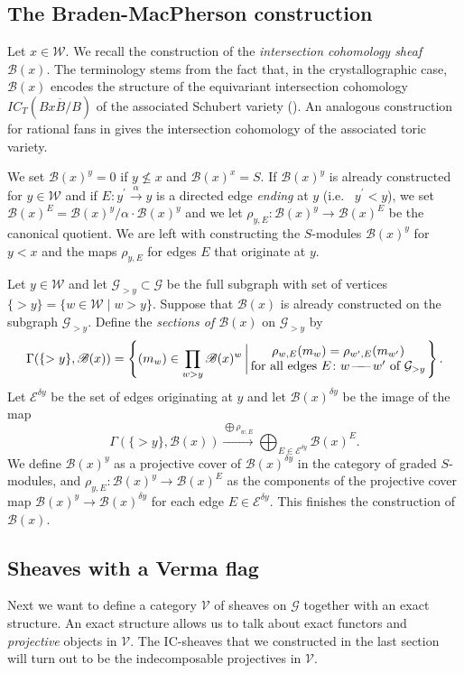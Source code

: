 \documentclass[12pt]{amsart}
\theoremstyle{definition}
\theoremstyle{remark}
\newcommand{\CE}{{\mathcal E}}
\newcommand{\CG}{{\mathcal G}}
\newcommand{\CV}{{\mathcal V}}
\newcommand{\CW}{{\mathcal W}}
\newcommand{\SB}{{\mathscr B}}
\newcommand{\linie}{{\,\text{---\!\!\!---}\,}}
\begin{document}
\subsection{The Braden-MacPherson construction}
Let $x\in\CW$. We recall the construction of the {\em intersection cohomology sheaf} $\SB(x)$. The terminology stems from the fact that, in the crystallographic case,  $\SB(x)$ encodes the structure of the equivariant intersection cohomology $IC_T(\overline{BxB/B})$ of the associated Schubert variety (\cite{BMP}). An analogous construction for rational fans in \cite{BBFK} gives the intersection cohomology of the associated toric variety. 

We set $\SB(x)^y=0$ if $y\not\leq x$ and $\SB(x)^x=S$. If $\SB(x)^y$ is already constructed for $y\in\CW$ and if $E\colon y^\prime\stackrel{\alpha}\to y$ is a directed  edge {\em ending} at $y$ (i.e.~ $y^\prime<y$), we set $\SB(x)^E=\SB(x)^y/ \alpha\cdot \SB(x)^y$ and we let $\rho_{y,E}\colon \SB(x)^y\to\SB(x)^E$ be the canonical quotient. We are left with constructing the $S$-modules $\SB(x)^y$ for $y<x$ and the maps $\rho_{y,E}$ for edges $E$ that originate at $y$. 

Let $y\in\CW$ and let $\CG_{>y}\subset\CG$ be the full subgraph with set of vertices $\{>y\}=\{w\in\CW\mid w>y\}$. Suppose that $\SB(x)$ is already  constructed on the subgraph $\CG_{>y}$. Define the {\em sections of $\SB(x)$} on $\CG_{>y}$ by
$$
\Gamma(\{>y\},\SB(x))=\left\{(m_w)\in\prod_{w>y}\SB(x)^w\left|\, \begin{matrix}\rho_{w,E}(m_w)=\rho_{w^\prime,E}(m_{w^\prime}) \\ \text{for all edges $E\colon w\linie w^\prime$ of $\CG_{>y}$}\end{matrix}\right.\right\}.
$$ 
Let $\CE^{\delta y}$ be the set of edges  originating at $y$ and let $\SB(x)^{\delta y}$ be the image of the map
$$
\Gamma(\{>y\},\SB(x))\stackrel{\bigoplus \rho_{w,E}}\longrightarrow \bigoplus_{E\in\CE^{\delta y}}\SB(x)^E.
$$
We define $\SB(x)^y$ as a projective cover of $\SB(x)^{\delta y}$ in the category of graded $S$-modules, and $\rho_{y,E}\colon \SB(x)^y\to\SB(x)^E$ as the components of the projective cover map $\SB(x)^y\to\SB(x)^{\delta y}$ for each edge $E\in\CE^{\delta y}$. This finishes the construction of $\SB(x)$.
\subsection{Sheaves with a Verma flag}
Next we want to define a category $\CV$ of sheaves on $\CG$ together with an exact structure. An exact structure allows us to talk about exact functors and {\em projective} objects in $\CV$. The IC-sheaves that we constructed in the last section will turn out to be the indecomposable projectives in $\CV$.
\end{document}
